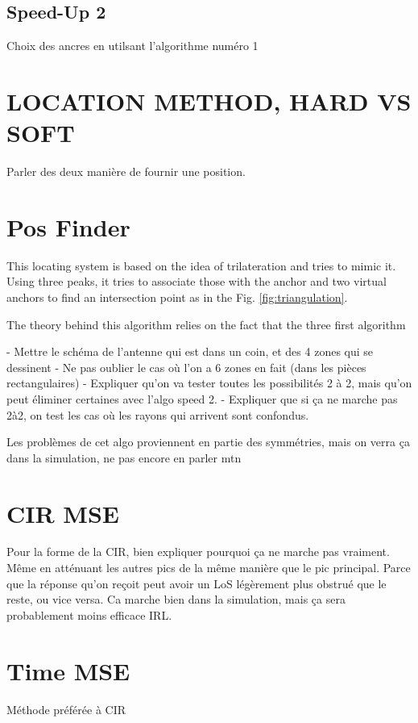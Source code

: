 \subsection{Speed-Up 2}

Choix des ancres en utilsant l'algorithme numéro 1

\color{red}
\section{LOCATION METHOD, HARD VS SOFT}
\color{black}

Parler des deux manière de fournir une position.

\section{Pos Finder}

This locating system is based on the idea of trilateration and tries to mimic it. Using three peaks, it tries to associate those with the anchor and two virtual anchors to find an intersection point as in the Fig. \ref{fig:triangulation}.

The theory behind this algorithm relies on the fact that the three first algorithm

- Mettre le schéma de l'antenne qui est dans un coin, et des 4 zones qui se dessinent
	- Ne pas oublier le cas où l'on a 6 zones en fait (dans les pièces rectangulaires)
- Expliquer qu'on va tester toutes les possibilités 2 à 2, mais qu'on peut éliminer certaines avec l'algo speed 2.
- Expliquer que si ça ne marche pas 2à2, on test les cas où les rayons qui arrivent sont confondus.


Les problèmes de cet algo proviennent en partie des symmétries, mais on verra ça dans la simulation, ne pas encore en parler mtn

\section{CIR MSE}

Pour la forme de la CIR, bien expliquer pourquoi ça ne marche pas vraiment. Même en atténuant les autres pics de la même manière que le pic principal. Parce que la réponse qu'on reçoit peut avoir un LoS légèrement plus obstrué que le reste, ou vice versa. Ca marche bien dans la simulation, mais ça sera probablement moins efficace IRL.

\section{Time MSE}

Méthode préférée à CIR
